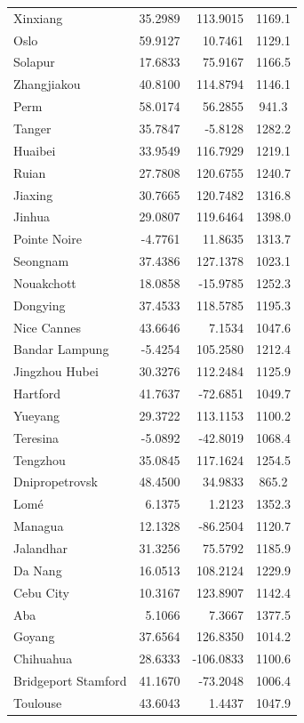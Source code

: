 \begin{longtable}{lrrc}
Xinxiang & 35.2989 & 113.9015 & 1169.1 \\
Oslo & 59.9127 & 10.7461 & 1129.1 \\
Solapur & 17.6833 & 75.9167 & 1166.5 \\
Zhangjiakou & 40.8100 & 114.8794 & 1146.1 \\
Perm & 58.0174 & 56.2855 & 941.3 \\
Tanger & 35.7847 & -5.8128 & 1282.2 \\
Huaibei & 33.9549 & 116.7929 & 1219.1 \\
Ruian & 27.7808 & 120.6755 & 1240.7 \\
Jiaxing & 30.7665 & 120.7482 & 1316.8 \\
Jinhua & 29.0807 & 119.6464 & 1398.0 \\
Pointe Noire & -4.7761 & 11.8635 & 1313.7 \\
Seongnam & 37.4386 & 127.1378 & 1023.1 \\
Nouakchott & 18.0858 & -15.9785 & 1252.3 \\
Dongying & 37.4533 & 118.5785 & 1195.3 \\
Nice Cannes & 43.6646 & 7.1534 & 1047.6 \\
Bandar Lampung & -5.4254 & 105.2580 & 1212.4 \\
Jingzhou  Hubei & 30.3276 & 112.2484 & 1125.9 \\
Hartford & 41.7637 & -72.6851 & 1049.7 \\
Yueyang & 29.3722 & 113.1153 & 1100.2 \\
Teresina & -5.0892 & -42.8019 & 1068.4 \\
Tengzhou & 35.0845 & 117.1624 & 1254.5 \\
Dnipropetrovsk & 48.4500 & 34.9833 & 865.2 \\
Lomé & 6.1375 & 1.2123 & 1352.3 \\
Managua & 12.1328 & -86.2504 & 1120.7 \\
Jalandhar & 31.3256 & 75.5792 & 1185.9 \\
Da Nang & 16.0513 & 108.2124 & 1229.9 \\
Cebu City & 10.3167 & 123.8907 & 1142.4 \\
Aba & 5.1066 & 7.3667 & 1377.5 \\
Goyang & 37.6564 & 126.8350 & 1014.2 \\
Chihuahua & 28.6333 & -106.0833 & 1100.6 \\
Bridgeport Stamford & 41.1670 & -73.2048 & 1006.4 \\
Toulouse & 43.6043 & 1.4437 & 1047.9 \\

\end{longtable}
